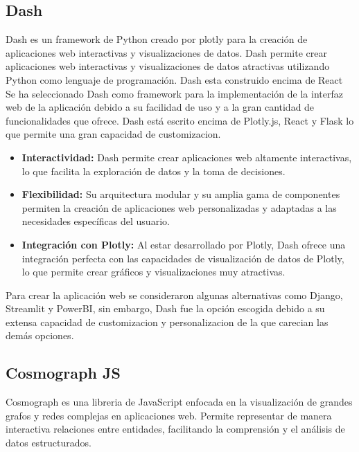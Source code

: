 \subsection{Dash}
Dash es un framework de Python creado por plotly para la creación de aplicaciones web interactivas y visualizaciones de datos. Dash permite crear aplicaciones web interactivas y visualizaciones de datos atractivas utilizando Python como lenguaje de programación. Dash esta construido encima de React Se ha seleccionado Dash como framework para la implementación de la interfaz web de la aplicación debido a su facilidad de uso y a la gran cantidad de funcionalidades que ofrece. Dash está escrito encima de Plotly.js, React y Flask lo que permite una gran capacidad de customizacion.

\begin{itemize}
	\item \textbf{Interactividad:} Dash permite crear aplicaciones web altamente interactivas, lo que facilita la exploración de datos y la toma de decisiones.
	\item \textbf{Flexibilidad:} Su arquitectura modular y su amplia gama de componentes permiten la creación de aplicaciones web personalizadas y adaptadas a las necesidades específicas del usuario.
	\item \textbf{Integración con Plotly:} Al estar desarrollado por Plotly, Dash ofrece una integración perfecta con las capacidades de visualización de datos de Plotly, lo que permite crear gráficos y visualizaciones muy atractivas.
\end{itemize}

Para crear la aplicación web se consideraron algunas alternativas como Django, Streamlit y PowerBI, sin embargo, Dash fue la opción escogida debido a su extensa capacidad de customizacion y personalizacion de la que carecian las demás opciones.

\subsection{Cosmograph JS}

Cosmograph es una libreria de JavaScript enfocada en la visualización de grandes grafos y redes complejas en aplicaciones web. Permite representar de manera interactiva relaciones entre entidades, facilitando la comprensión y el análisis de datos estructurados.

